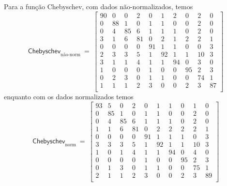 \documentclass[10pt,a4paper,twocolumn]{article}
\begin{document}
      Para a função Chebyschev, com dados não-normalizados, temos
      \begin{equation*}
        \textsf{Chebyschev}_\text{não-norm}~=~ \left [
        \begin{smallmatrix}
          90 &  0 &  0 &  2 &  0 &  1 &  2 &  0 &  2 &  0 \\
           0 & 88 &  1 &  0 &  1 &  1 &  0 &  0 &  2 &  0 \\ 
           0 &  4 & 85 &  6 &  1 &  1 &  1 &  0 &  2 &  0 \\ 
           3 &  1 &  6 & 81 &  0 &  2 &  1 &  2 &  2 &  1 \\ 
           0 &  0 &  0 &  0 & 91 &  1 &  1 &  0 &  0 &  3 \\ 
           2 &  3 &  3 &  5 &  1 & 92 &  1 &  1 & 10 &  3 \\ 
           3 &  1 &  1 &  4 &  1 &  1 & 94 &  0 &  3 &  0 \\ 
           1 &  0 &  0 &  0 &  1 &  0 &  0 & 95 &  2 &  3 \\ 
           0 &  2 &  3 &  0 &  1 &  1 &  0 &  0 & 74 &  1 \\ 
           1 &  1 &  1 &  2 &  3 &  0 &  0 &  2 &  3 & 87 \\ 
        \end{smallmatrix} \right ]
      \end{equation*}
      enquanto com os dados normalizados temos
      \begin{equation*}
        \textsf{Chebyschev}_\text{norm}~=~ \left [
        \begin{smallmatrix}
          93 &  5 &  0 &  2 &  0 &  1 &  1 &  0 &  1 &  0 \\
           0 & 85 &  1 &  0 &  1 &  1 &  0 &  0 &  2 &  0 \\ 
           0 &  4 & 85 &  6 &  1 &  1 &  1 &  0 &  2 &  0 \\ 
           1 &  1 &  6 & 81 &  0 &  2 &  2 &  2 &  2 &  1 \\ 
           0 &  0 &  0 &  0 & 91 &  1 &  1 &  1 &  0 &  3 \\ 
           3 &  3 &  3 &  5 &  1 & 92 &  1 &  1 & 10 &  3 \\ 
           1 &  0 &  1 &  4 &  1 &  1 & 94 &  0 &  4 &  0 \\ 
           0 &  0 &  0 &  0 &  1 &  0 &  0 & 95 &  2 &  3 \\ 
           0 &  1 &  3 &  0 &  1 &  1 &  0 &  0 & 75 &  1 \\ 
           2 &  1 &  1 &  2 &  3 &  0 &  0 &  2 &  3 & 89 \\ 
        \end{smallmatrix} \right ]
      \end{equation*}
\end{document}
